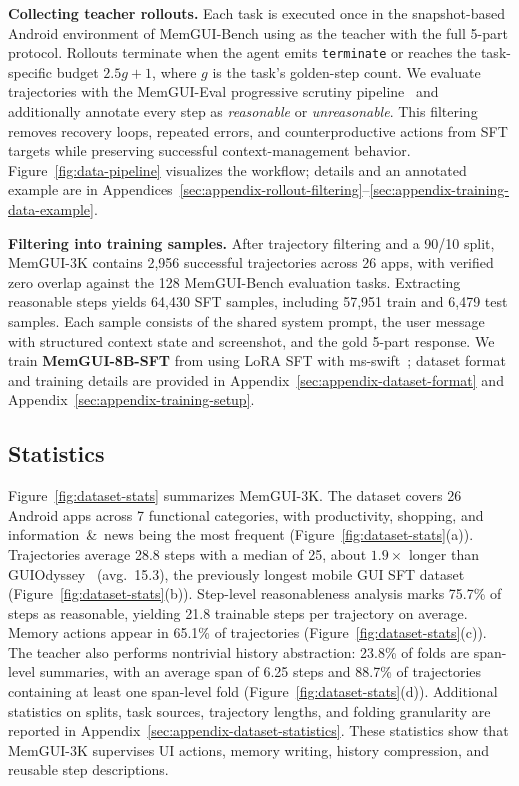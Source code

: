 \textbf{Collecting teacher rollouts.}
Each task is executed once in the snapshot-based Android environment of MemGUI-Bench using  as the teacher with the full 5-part \conact protocol. Rollouts terminate when the agent emits \texttt{terminate} or reaches the task-specific budget $2.5g+1$, where $g$ is the task's golden-step count. We evaluate trajectories with the MemGUI-Eval progressive scrutiny pipeline~\cite{liu2026memgui} and additionally annotate every step as \emph{reasonable} or \emph{unreasonable}. This filtering removes recovery loops, repeated errors, and counterproductive actions from SFT targets while preserving successful context-management behavior. Figure~\ref{fig:data-pipeline} visualizes the workflow; details and an annotated example are in Appendices~\ref{sec:appendix-rollout-filtering}--\ref{sec:appendix-training-data-example}.

\textbf{Filtering into training samples.}
After trajectory filtering and a 90/10 split, MemGUI-3K contains 2{,}956 successful trajectories across 26 apps, with verified zero overlap against the 128 MemGUI-Bench evaluation tasks. Extracting reasonable steps yields 64{,}430 SFT samples, including 57{,}951 train and 6{,}479 test samples. Each sample consists of the shared system prompt, the user message with structured context state and screenshot, and the gold 5-part \conact response. We train \textbf{MemGUI-8B-SFT} from  using LoRA SFT with ms-swift~\cite{zhao2024swift}; dataset format and training details are provided in Appendix~\ref{sec:appendix-dataset-format} and Appendix~\ref{sec:appendix-training-setup}.

\subsection{Statistics}
\label{sec:dataset-statistics}



Figure~\ref{fig:dataset-stats} summarizes MemGUI-3K. The dataset covers 26 Android apps across 7 functional categories, with productivity, shopping, and information~\&~news being the most frequent (Figure~\ref{fig:dataset-stats}(a)). Trajectories average 28.8 steps with a median of 25, about $1.9\times$ longer than GUIOdyssey~\cite{lu2025guiodyssey} (avg.\ 15.3), the previously longest mobile GUI SFT dataset (Figure~\ref{fig:dataset-stats}(b)). Step-level reasonableness analysis marks 75.7\% of steps as reasonable, yielding 21.8 trainable steps per trajectory on average. Memory actions appear in 65.1\% of trajectories (Figure~\ref{fig:dataset-stats}(c)). The teacher also performs nontrivial history abstraction: 23.8\% of folds are span-level summaries, with an average span of 6.25 steps and 88.7\% of trajectories containing at least one span-level fold (Figure~\ref{fig:dataset-stats}(d)). Additional statistics on splits, task sources, trajectory lengths, and folding granularity are reported in Appendix~\ref{sec:appendix-dataset-statistics}. These statistics show that MemGUI-3K supervises UI actions, memory writing, history compression, and reusable step descriptions.
